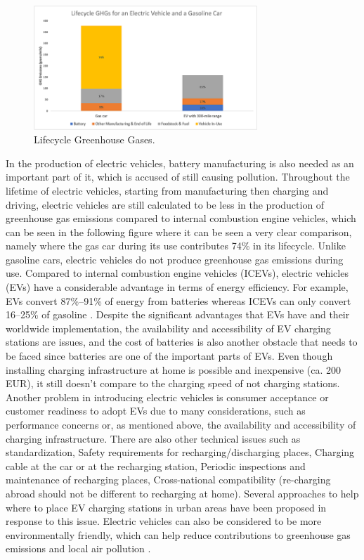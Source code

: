 \begin{figure}[hbt!]
\begin{center}
\includegraphics[width=0.75\textwidth]{Bilder/[2].png}
\caption{Lifecycle Greenhouse Gases. \cite{EPA_Myths}}\label{fig:[3]}
\end{center}
\end{figure}

In the production of electric vehicles, battery manufacturing is also needed as an important part of it, which is accused of still causing pollution. Throughout the lifetime of electric vehicles, starting from manufacturing then charging and driving, electric vehicles are still calculated to be less in the production of greenhouse gas emissions compared to internal combustion engine vehicles, which can be seen in the following figure where it can be seen a very clear comparison, namely where the gas car during its use contributes 74\% in its lifecycle. Unlike gasoline cars, electric vehicles do not produce greenhouse gas emissions during use. Compared to internal combustion engine vehicles (\gls{ICEV}s), electric vehicles (\gls{EV}s) have a considerable advantage in terms of energy efficiency. For example, EVs convert 87\%–91\% of energy from batteries whereas ICEVs can only convert 16–25\% of gasoline \cite{EPA_Myths}. Despite the significant advantages that EVs have and their worldwide implementation, the availability and accessibility of EV charging stations are issues, and the cost of batteries is also another obstacle that needs to be faced since batteries are one of the important parts of EVs. Even though installing charging infrastructure at home is possible and inexpensive (ca. 200 EUR), it still doesn't compare to the charging speed of not charging stations. Another problem in introducing electric vehicles is consumer acceptance or customer readiness to adopt EVs due to many considerations, such as performance concerns or, as mentioned above, the availability and accessibility of charging infrastructure. There are also other technical issues such as standardization, Safety requirements for recharging/discharging places, Charging cable at the car or at the recharging station, Periodic inspections and maintenance of recharging places, Cross-national compatibility (re-charging abroad should not be different to recharging at home). Several approaches to help where to place EV charging stations in urban areas have been proposed in response to this issue. Electric vehicles can also be considered to be more environmentally friendly, which can help reduce contributions to greenhouse gas emissions and local air pollution \cite{Ajanovic2014}.
\\

